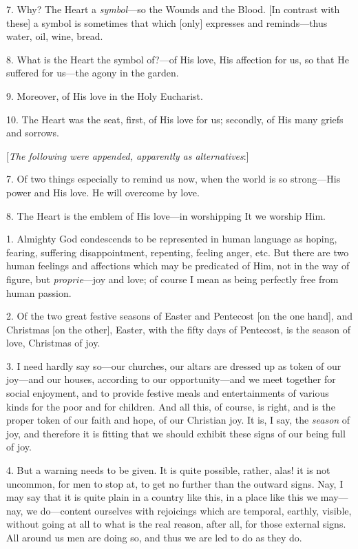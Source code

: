 7. Why? The Heart a \emph{symbol}—so the Wounds
and the Blood. [In contrast with these] a symbol is sometimes that
which [only] expresses and reminds—thus water, oil, wine, bread.

8. What is the Heart the symbol of?—of His
love, His affection for us, so that He suffered for us—the agony in
the garden.

9. Moreover, of His love in the Holy Eucharist.

10. The Heart was the seat, first, of His love
for us; secondly, of His many griefs and sorrows.

[\emph{The following were appended, apparently as
alternatives}:]

7. Of two things especially to remind us now,
when the world is so strong—His power and His love. He will overcome
by love.

8. The Heart is the emblem of His love—in
worshipping It we worship Him.


1. Almighty God condescends to be represented in
human language as hoping, fearing, suffering disappointment,
repenting, feeling anger, etc. But there are two human feelings and
affections which may be predicated of Him, not in the way of figure,
but \emph{proprie}—joy and love; of course I mean as being perfectly
free from human passion.

2. Of the two great festive seasons of Easter and
Pentecost [on the one hand], and Christmas [on the other], Easter,
with the fifty days of Pentecost, is the season of love, Christmas of
joy.

3. I need hardly say so—our churches, our
altars are dressed up as token of our joy—and our houses, according
to our opportunity—and we meet together for social enjoyment, and to
provide festive meals and entertainments of various kinds for the poor
and for children. And all this, of course, is right, and is the proper
token of our faith and hope, of our Christian joy. It is, I say, the \emph{season}
of joy, and therefore it is fitting that we should exhibit these signs
of our being full of joy.

4. But a warning needs to be given. It is quite
possible, rather, alas! it is not uncommon, for men to stop at,
to get no further than the outward signs. Nay, I may say that it is
quite plain in a country like this, in a place like this we may—nay,
we do—content ourselves with rejoicings which are temporal, earthly,
visible, without going at all to what is the real reason, after all,
for those external signs. All around us men are doing so, and thus we
are led to do as they do.

